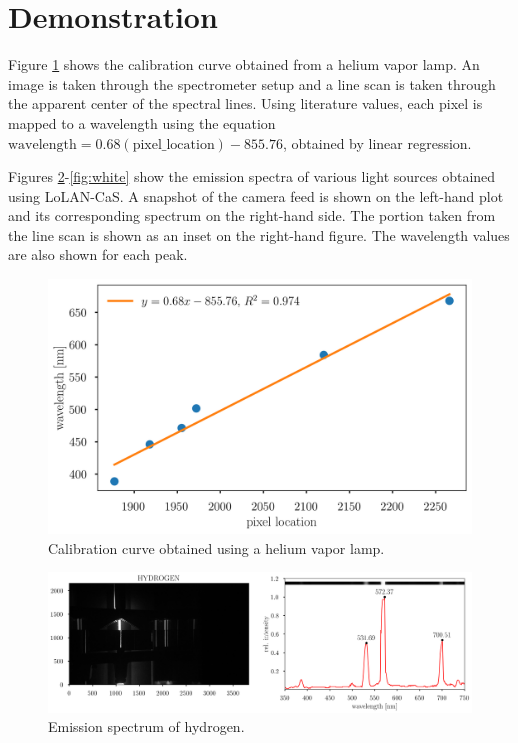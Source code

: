 \documentclass[12pt,a4paper,twoside]{article}
\begin{document}
\section{Demonstration}
Figure \ref{fig:calibration} shows the calibration curve obtained from a helium vapor lamp. An image is taken through the spectrometer setup and a line scan is taken through the apparent center of the spectral lines. Using literature values, each pixel is mapped to a wavelength using the equation $\textrm{wavelength} = 0.68(\textrm{pixel\_location}) - 855.76$, obtained by linear regression.

Figures \ref{fig:hydrogen}-\ref{fig:white} show the emission spectra of various light sources obtained using LoLAN-CaS. A snapshot of the camera feed is shown on the left-hand plot and its corresponding spectrum on the right-hand side. The portion taken from the line scan is shown as an inset on the right-hand figure. The wavelength values are also shown for each peak.

\begin{figure}[H]
	\centering
	\includegraphics[width=0.9\linewidth]{calibcurve.png}
	\caption{Calibration curve obtained using a helium vapor lamp.}
	\label{fig:calibration}
\end{figure}

\begin{figure}[H]
	\centering
	\includegraphics[width=\linewidth]{HYDROGEN.png}
	\caption{Emission spectrum of hydrogen.}
	\label{fig:hydrogen}
\end{figure}
\end{document}
